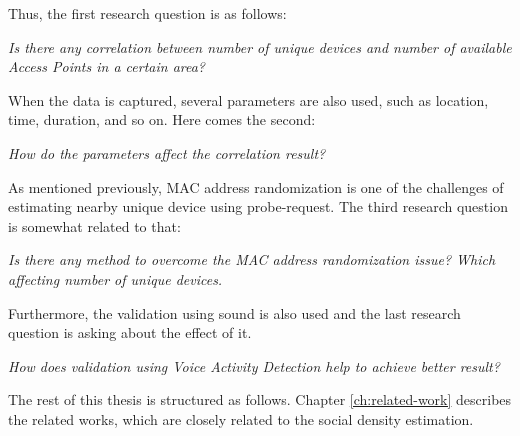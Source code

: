 Thus, the first research question is as follows:
\begin{displayquote}\textit{
Is there any correlation between number of unique devices and number of available Access Points in a certain area?}
\end{displayquote}

When the data is captured, several parameters are also used, such as location, time, duration, and so on. Here comes the second:
\begin{displayquote}\textit{
How do the parameters affect the correlation result?}
\end{displayquote}

As mentioned previously, MAC address randomization is one of the challenges of estimating nearby unique device using probe-request. The third research question is somewhat related to that:
\begin{displayquote}\textit{
Is there any method to overcome the MAC address randomization issue? Which affecting number of unique devices.}
\end{displayquote}

Furthermore, the validation using sound is also used and the last research question is asking about the effect of it.
\begin{displayquote}\textit{
How does validation using Voice Activity Detection help to achieve better result?}
\end{displayquote}

The rest of this thesis is structured as follows. Chapter \ref{ch:related-work} describes the related works, which are closely related to the social density estimation.






